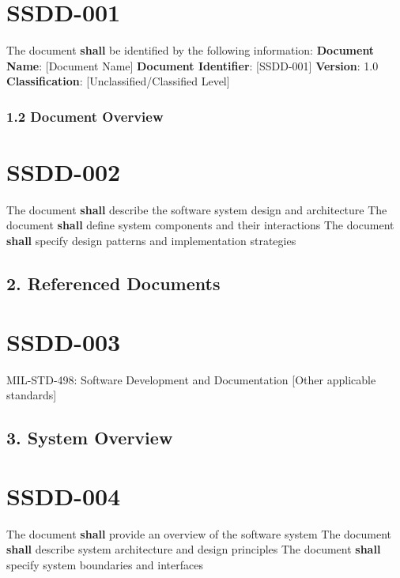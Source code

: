 \section{SSDD-001}\label{SSDD-001}

The document \textbf{shall} be identified by the following information:
\textbf{Document Name}: [Document Name]
\textbf{Document Identifier}: [SSDD-001]
\textbf{Version}: 1.0
\textbf{Classification}: [Unclassified/Classified Level]

\subsubsection{1.2 Document Overview}

\section{SSDD-002}\label{SSDD-002}

The document \textbf{shall} describe the software system design and architecture
The document \textbf{shall} define system components and their interactions
The document \textbf{shall} specify design patterns and implementation strategies

\subsection{2. Referenced Documents}

\section{SSDD-003}\label{SSDD-003}

MIL-STD-498: Software Development and Documentation
[Other applicable standards]\\

\subsection{3. System Overview}

\section{SSDD-004}\label{SSDD-004}

The document \textbf{shall} provide an overview of the software system
The document \textbf{shall} describe system architecture and design principles
The document \textbf{shall} specify system boundaries and interfaces

